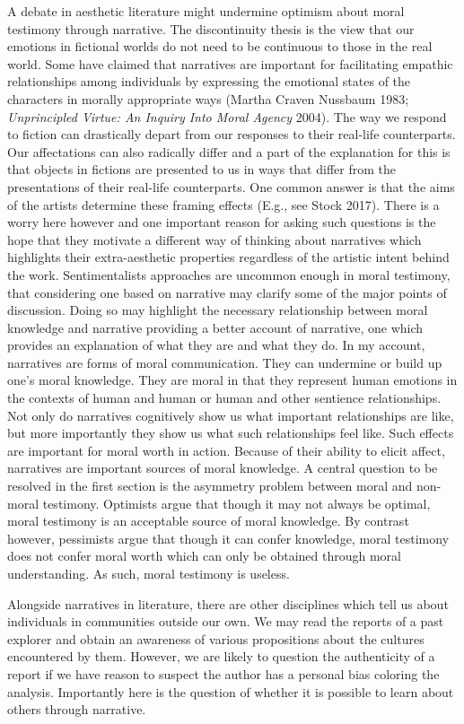 \documentclass[12pt]{book}
\theoremstyle{definition}
\theoremstyle{remark}
\begin{document}
A debate in aesthetic literature might undermine optimism about moral testimony through narrative. The discontinuity thesis is the view that our emotions in fictional worlds do not need to be continuous to those in the real world. Some have claimed that narratives are important for facilitating empathic relationships among individuals by expressing the emotional states of the characters in morally appropriate ways (Martha Craven Nussbaum 1983; \emph{Unprincipled {Virtue}: {An Inquiry Into Moral Agency}} 2004). The way we respond to fiction can drastically depart from our responses to their real-life counterparts. Our affectations can also radically differ and a part of the explanation for this is that objects in fictions are presented to us in ways that differ from the presentations of their real-life counterparts. One common answer is that the aims of the artists determine these framing effects (E.g., see Stock 2017). There is a worry here however and one important reason for asking such questions is the hope that they motivate a different way of thinking about narratives which highlights their extra-aesthetic properties regardless of the artistic intent behind the work. Sentimentalists approaches are uncommon enough in moral testimony, that considering one based on narrative may clarify some of the major points of discussion. Doing so may highlight the necessary relationship between moral knowledge and narrative providing a better account of narrative, one which provides an explanation of what they are and what they do. In my account, narratives are forms of moral communication. They can undermine or build up one's moral knowledge. They are moral in that they represent human emotions in the contexts of human and human or human and other sentience relationships. Not only do narratives cognitively show us what important relationships are like, but more importantly they show us what such relationships feel like. Such effects are important for moral worth in action. Because of their ability to elicit affect, narratives are important sources of moral knowledge. A central question to be resolved in the first section is the asymmetry problem between moral and non-moral testimony. Optimists argue that though it may not always be optimal, moral testimony is an acceptable source of moral knowledge. By contrast however, pessimists argue that though it can confer knowledge, moral testimony does not confer moral worth which can only be obtained through moral understanding. As such, moral testimony is useless.

Alongside narratives in literature, there are other disciplines which tell us about individuals in communities outside our own. We may read the reports of a past explorer and obtain an awareness of various propositions about the cultures encountered by them. However, we are likely to question the authenticity of a report if we have reason to suspect the author has a personal bias coloring the analysis. Importantly here is the question of whether it is possible to learn about others through narrative.
\end{document}
